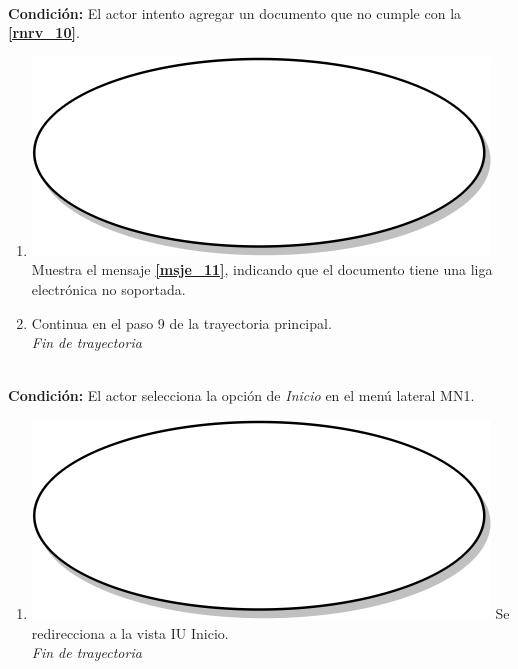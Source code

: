 \textbf{} \\
\textbf{Condición:} El actor intento agregar un documento que no cumple con la \textbf{\ref{rnrv_10}}.\\
 \begin{enumerate}[label=C\arabic*]
    \item {\includegraphics[scale=.05]{Capitulo3/img/proceso.png} Muestra el mensaje \textbf{\ref{msje_11}}, indicando que el documento tiene una liga electrónica no soportada.}
    \item {Continua en el paso 9 de la trayectoria principal.} \\
    \textit{Fin de trayectoria} \\
\end{enumerate}

\textbf{} \\
\textbf{Condición:} El actor selecciona la opción de \textit{Inicio} en el menú lateral MN1. \\
 \begin{enumerate}[label=D\arabic*]
    \item {\includegraphics[scale=.05]{Capitulo3/img/proceso.png} Se redirecciona a la vista IU Inicio.} \\
    \textit{Fin de trayectoria} \\
\end{enumerate}

